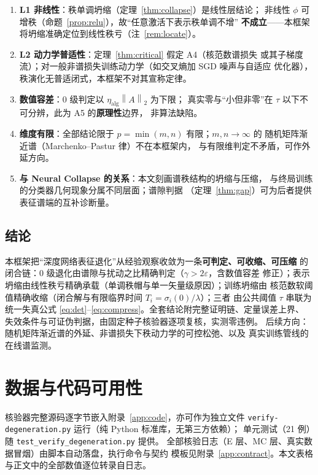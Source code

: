 \documentclass[UTF8,11pt,a4paper]{ctexart}
\theoremstyle{plain}
\theoremstyle{definition}
\theoremstyle{remark}
\newcommand{\Tnorm}[1]{\left\lVert #1\right\rVert_2}
\begin{document}
\begin{enumerate}
\item \textbf{L1 非线性}：秩单调坍缩（定理~\ref{thm:collapse}）是线性层结论；
  非线性 $\phi$ 可增秩（命题~\ref{prop:relu}），故“任意激活下表示秩单调不增”
  \textbf{不成立}——本框架将坍缩准确定位到线性秩亏（注~\ref{rem:locate}）。
\item \textbf{L2 动力学普适性}：定理~\ref{thm:critical} 假定 A4（核范数谱损失
  或其子梯度流）；对一般非谱损失训练动力学（如交叉熵加 SGD 噪声与自适应
  优化器），秩演化无普适闭式，本框架不对其宣称定律。
\item \textbf{数值容差}：0 级判定以 $\eta_{\mathrm{alg}}\Tnorm{A}$ 为下限；
  真实零与“小但非零”在 $\tau$ 以下不可分辨，此为 A5 的\textbf{原理性}边界，
  非算法缺陷。
\item \textbf{维度有限}：全部结论限于 $p=\min(m,n)$ 有限；$m,n\to\infty$ 的
  随机矩阵渐近谱（Marchenko--Pastur 律\cite{marchenko1967}）不在本框架内，
  与有限维判定不矛盾，可作外延方向。
\item \textbf{与 Neural Collapse 的关系}：本文刻画谱秩结构的坍缩与压缩，
  与终局训练的分类器几何现象\cite{papyan2020}分属不同层面；谱隙判据
  （定理~\ref{thm:gap}）可为后者提供表征谱端的互补诊断量。
\end{enumerate}

\subsection{结论}

本框架把“深度网络表征退化”从经验观察收敛为一条\textbf{可判定、可收缩、可压缩}
的闭合链：0 级退化由谱隙与扰动之比精确判定（$\gamma>2\varepsilon$，含数值容差
修正）；表示坍缩由线性秩亏精确承载（单调秩帽与单一矢量级原因）；训练坍缩由
核范数软阈值精确收缩（闭合解与有限临界时间 $T_i=\sigma_i(0)/\lambda$）；三者
由公共阈值 $\tau$ 串联为统一失真公式
\eqref{eq:det}--\eqref{eq:compress}。全套结论附完整证明链、定量误差上界、
失效条件与可证伪判据，由固定种子核验器逐项复核，实测零违例。
后续方向：随机矩阵渐近谱的外延、非谱损失下秩动力学的可控松弛、以及
真实训练管线的在线谱监测。

\section{数据与代码可用性}\label{sec:availability}

核验器完整源码逐字节嵌入附录~\ref{app:code}，亦可作为独立文件
\nolinkurl{verify-degeneration.py} 运行（纯 Python 标准库，无第三方依赖）；
单元测试（21 例）随 \nolinkurl{test_verify_degeneration.py} 提供。
全部核验日志（E 层、MC 层、真实数据冒烟）由脚本自动落盘，执行命令与契约
模板见附录~\ref{app:contract}。本文表格与正文中的全部数值逐位转录自日志。
\end{document}
